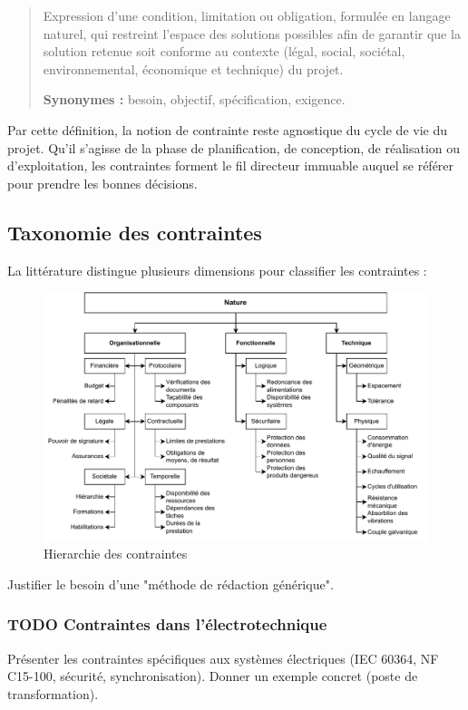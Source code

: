 \documentclass[a4paper,12pt]{article}
\begin{document}
\label{orgd37e898}
\begin{verse}
Expression d'une condition, limitation ou obligation, formulée en langage naturel, qui restreint l’espace des solutions possibles afin de garantir que la solution retenue soit conforme au contexte (légal, social, sociétal, environnemental, économique et technique) du projet.

\textbf{Synonymes :} besoin, objectif, spécification, exigence.\\
\end{verse}

Par cette définition, la notion de contrainte reste agnostique du cycle de vie du projet. Qu’il s’agisse de la phase de planification, de conception, de réalisation ou d’exploitation, les contraintes forment le fil directeur immuable auquel se référer pour prendre les bonnes décisions.
\subsection{Taxonomie des contraintes}
\label{sec:org317c435}

La littérature distingue plusieurs dimensions pour classifier les contraintes :

\begin{figure}[htbp]
\centering
\includegraphics[width=.9\linewidth]{./svg/taxonomie.pdf}
\caption{\label{fig:orga687d35}Hierarchie des contraintes}
\end{figure}

Justifier le besoin d'une "méthode de rédaction générique".
\subsubsection{{\bfseries\sffamily TODO} Contraintes dans l’électrotechnique}
\label{sec:org490812c}
Présenter les contraintes spécifiques aux systèmes électriques (IEC 60364, NF C15-100, sécurité, synchronisation).  
Donner un exemple concret (poste de transformation).
\end{document}
